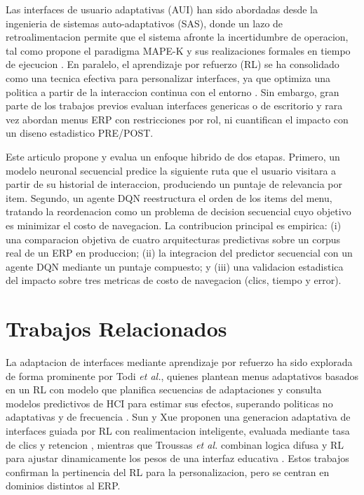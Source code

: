 \documentclass[conference]{IEEEtran}
\begin{document}
Las interfaces de usuario adaptativas (AUI) han sido abordadas desde la ingenieria de sistemas auto-adaptativos (SAS), donde un lazo de retroalimentacion permite que el sistema afronte la incertidumbre de operacion, tal como propone el paradigma MAPE-K y sus realizaciones formales en tiempo de ejecucion \cite{b_activforms,b_kephart}. En paralelo, el aprendizaje por refuerzo (RL) se ha consolidado como una tecnica efectiva para personalizar interfaces, ya que optimiza una politica a partir de la interaccion continua con el entorno \cite{b_sunxue,b_troussas}. Sin embargo, gran parte de los trabajos previos evaluan interfaces genericas o de escritorio y rara vez abordan menus ERP con restricciones por rol, ni cuantifican el impacto con un diseno estadistico PRE/POST.

Este articulo propone y evalua un enfoque hibrido de dos etapas. Primero, un modelo neuronal secuencial predice la siguiente ruta que el usuario visitara a partir de su historial de interaccion, produciendo un puntaje de relevancia por item. Segundo, un agente DQN reestructura el orden de los items del menu, tratando la reordenacion como un problema de decision secuencial cuyo objetivo es minimizar el costo de navegacion. La contribucion principal es empirica: (i) una comparacion objetiva de cuatro arquitecturas predictivas sobre un corpus real de un ERP en produccion; (ii) la integracion del predictor secuencial con un agente DQN mediante un puntaje compuesto; y (iii) una validacion estadistica del impacto sobre tres metricas de costo de navegacion (clics, tiempo y error).

\section{Trabajos Relacionados}
La adaptacion de interfaces mediante aprendizaje por refuerzo ha sido explorada de forma prominente por Todi \textit{et al.}, quienes plantean menus adaptativos basados en un RL con modelo que planifica secuencias de adaptaciones y consulta modelos predictivos de HCI para estimar sus efectos, superando politicas no adaptativas y de frecuencia \cite{b_todi}. Sun y Xue proponen una generacion adaptativa de interfaces guiada por RL con realimentacion inteligente, evaluada mediante tasa de clics y retencion \cite{b_sunxue}, mientras que Troussas \textit{et al.} combinan logica difusa y RL para ajustar dinamicamente los pesos de una interfaz educativa \cite{b_troussas}. Estos trabajos confirman la pertinencia del RL para la personalizacion, pero se centran en dominios distintos al ERP.
\end{document}
